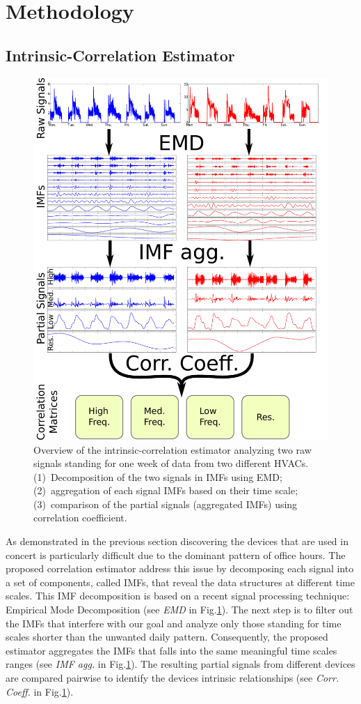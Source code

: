 
\section{Methodology}

\subsection{Intrinsic-Correlation Estimator} \label{methodo:est}

\begin{figure}[t!]
 \includegraphics[width=.5\textwidth]{img/estimator.pdf}
 \caption{Overview of the intrinsic-correlation estimator analyzing two raw signals standing for one week of data from two different HVACs. (1)~Decomposition of the two signals in IMFs using EMD; (2)~aggregation of each signal IMFs based on their time scale; (3)~comparison of the partial signals (aggregated IMFs) using correlation coefficient.}
 \label{fig:diagram1}
\end{figure}

As demonstrated in the previous section discovering the devices that are used in concert is particularly difficult due to the dominant pattern of office hours.
The proposed correlation estimator address this issue by decomposing each signal into a set of components, called IMFs, that reveal the data structures at different time scales.
This IMF decomposition is based on a recent signal processing technique: Empirical Mode Decomposition (see \emph{EMD} in Fig.\ref{fig:diagram1}).
The next step is to filter out the IMFs that interfere with our goal and analyze only those standing for time scales shorter than the unwanted daily pattern.
Consequently, the proposed estimator aggregates the IMFs that falls into the same meaningful time scales ranges (see \emph{IMF agg.} in Fig.\ref{fig:diagram1}).
The resulting partial signals from different devices are compared pairwise to identify the devices intrinsic relationships (see \emph{Corr. Coeff.} in Fig.\ref{fig:diagram1}). 

